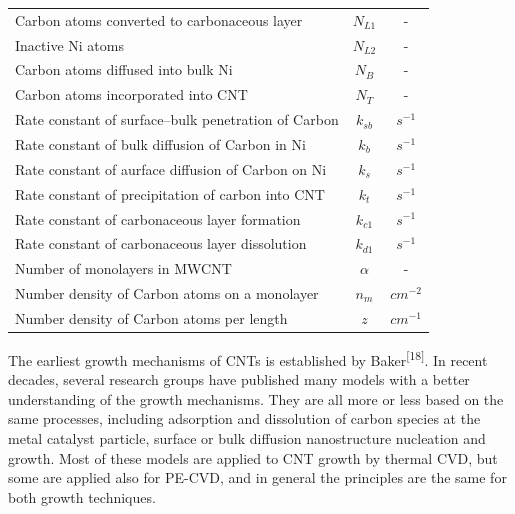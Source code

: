 \begin{table}[H]
\begin{tabular}{@{}lcc@{}}
Carbon atoms converted to carbonaceous layer                                 & $N_{L1}$ & -         \\
Inactive Ni atoms                                                            & $N_{L2}$ & -         \\
Carbon atoms diffused into bulk Ni                                           & $N_{B}$  & -         \\
Carbon atoms incorporated into CNT                                           & $N_{T}$  & -         \\
Rate constant of surface–bulk penetration of Carbon                          & $k_{sb}$ & $s^{-1}$  \\
Rate constant of bulk diffusion of Carbon in Ni                              & $k_{b}$  & $s^{-1}$  \\
Rate constant of aurface diffusion of Carbon on Ni                           & $k_{s}$  & $s^{-1}$  \\
Rate constant of precipitation of carbon into  CNT                           & $k_{t}$  & $s^{-1}$  \\
Rate constant of carbonaceous layer formation                                & $k_{c1}$ & $s^{-1}$  \\
Rate constant of carbonaceous layer dissolution                              & $k_{d1}$ & $s^{-1}$  \\
Number of monolayers in MWCNT                                                & $\alpha$ & -         \\
Number density of Carbon atoms on a monolayer                                & $n_{m}$  & $cm^{-2}$ \\
Number density of Carbon atoms per length                                    & $z$      & $cm^{-1}$ \\ \bottomrule
\end{tabular}
\end{table}
The earliest growth mechanisms of CNTs is established by Baker\textsuperscript{[18]}. In recent decades, several research groups have published many models with a better understanding of the growth mechanisms. They are all more or less based on the same processes, including adsorption and dissolution of carbon species at the metal catalyst particle, surface or bulk diﬀusion nanostructure nucleation and growth. Most of these models are applied to CNT growth by thermal CVD, but some are applied also for PE-CVD, and in general the principles are the same for both growth techniques.

